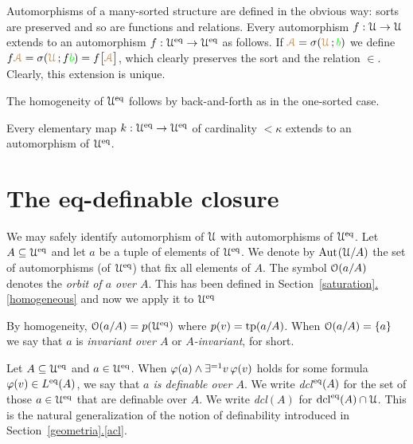 \documentclass[creche.tex]{subfiles}
\begin{document}
Automorphisms of a many-sorted structure are defined in the obvious way: sorts are preserved and so are functions and relations.
Every automorphism $f:\EuScript U\rightarrow\EuScript U$ extends to an automorphism $f:\EuScript U^{{\rm eq}}\rightarrow\EuScript U^{{\rm eq}}$ as follows.
If ${\color{brown}\EuScript A}=\sigma({\color{brown}\EuScript U}\,;{\color{green} b})$ we define $f{\color{brown}\EuScript A}=\sigma({\color{brown}\EuScript U}\,;f{\color{green} b})=f\big[{\color{brown}\EuScript A}\big]$, which clearly preserves the sort and the relation $\in$.
Clearly, this extension is unique.

The homogeneity of $\EuScript U^{{\rm eq}}$ follows by back-and-forth as in the one-sorted case.

\begin{proposition}\label{prop_Ueq_homogeneous}
Every elementary map $k:\EuScript U^{{\rm eq}}\to\EuScript U^{{\rm eq}}$ of cardinality $<\kappa$ extends to an automorphism of $\EuScript U^{{\rm eq}}$.\QED
\end{proposition} 

\section{The eq-definable closure}
We may safely identify automorphism of $\EuScript U$ with automorphisms of $\EuScript U^{{\rm eq}}$.
Let $A\subseteq\EuScript U^{{\rm eq}}$ and let $a$ be a tuple of elements of $\EuScript U^{{{\rm eq}}}$.
We denote by \emph{${\rm Aut\kern.15ex}(\EuScript U/A)$\/} the set of automorphisms (of $\EuScript U^{{\rm eq}}$) that fix all elements of $A$.
The symbol \emph{$\EuScript O(a/A)$\/} denotes the \emph{orbit of $a$ over $A$}.
This has been defined in Section~\hyperref[homogeneous]{\ref*{saturation}.\ref*{homogeneous}} and now we apply it to $\EuScript U^{{\rm eq}}$


By homogeneity, $\EuScript O(a/A)=p(\EuScript U^{{\rm eq}})$ where $p(v)={\rm tp}(a/A)$.
When $\EuScript O(a/A)=\{a\}$ we say that $a$ is \emph{invariant over $A$\/} or \emph{$A$-invariant}, for short.


\begin{definition}\label{def_def}
Let $A\subseteq\EuScript U^{{\rm eq}}$ and $a\in\EuScript U^{{\rm eq}}$.
When $\varphi(a)\wedge\exists^{=1}v\,\varphi(v)$ holds for some formula $\varphi(v)\in L^{{\rm eq}}(A)$, we say that \emph{$a$ is definable over $A$}.
We write \emph{\rm dcl$^{\rm eq}(A)$\/} for the set of those $a\in\EuScript U^{{\rm eq}}$ that are definable over $A$.
We write \emph{\rm dcl$(A)$\/} for $\mathop{\rm dcl}^{{\rm eq}}(A)\cap\EuScript U$.
This is the natural generalization of the notion of definability introduced in Section~\hyperref[acl]{\ref*{geometria}.\ref*{acl}}.\QED
\end{definition}
\end{document}
